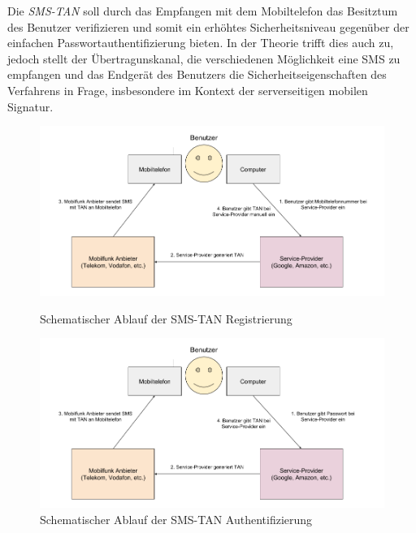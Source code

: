 \documentclass[11pt,a4paper,ngerman]{scrreprt}
\begin{document}
Die \textit{SMS-TAN} soll durch das Empfangen mit dem Mobiltelefon das Besitztum des Benutzer verifizieren und somit ein erhöhtes Sicherheitsniveau gegenüber der einfachen Passwortauthentifizierung bieten. In der Theorie trifft dies auch zu, jedoch stellt der Übertragunskanal, die verschiedenen Möglichkeit eine SMS zu empfangen und das Endgerät des Benutzers die Sicherheitseigenschaften des Verfahrens in Frage, insbesondere im Kontext der serverseitigen mobilen Signatur.
\begin{figure}[htbp]
    \centering
        \includegraphics[width=\textwidth]{Abbildungen/Ablauf_SMS-TAN_Registrierung.png}
    \caption{Schematischer Ablauf der SMS-TAN Registrierung}
    \label{fig:SMS-TAN_Registrierung}

    \centering
        \includegraphics[width=\textwidth]{Abbildungen/Ablauf_SMS-TAN.png}
    \caption{Schematischer Ablauf der SMS-TAN Authentifizierung}
    \label{fig:SMS-TAN}
\end{figure}
\clearpage
\end{document}
